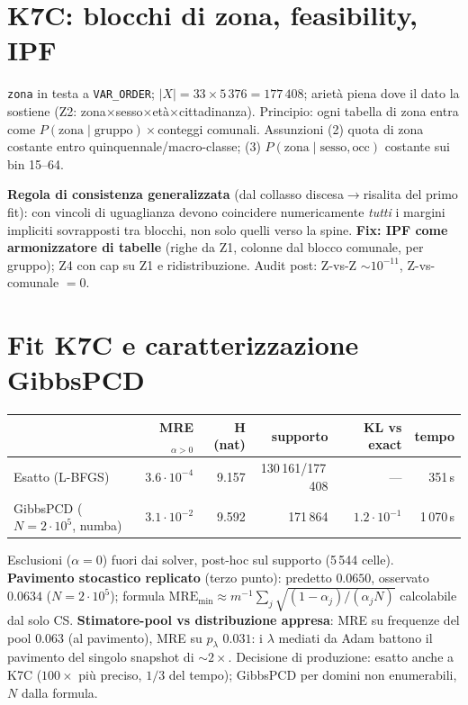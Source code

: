 \documentclass[11pt,a4paper]{article}
\newcommand{\code}[1]{\texttt{#1}}
\begin{document}
\section{K7C: blocchi di zona, feasibility, IPF}
\label{sec:k7c}
\code{zona} in testa a \code{VAR\_ORDER}; $|X| = 33\times5\,376 = 177\,408$;
ariet\`a piena dove il dato la sostiene (Z2:
zona$\times$sesso$\times$et\`a$\times$cittadinanza). Principio: ogni tabella
di zona entra come $P(\text{zona}\mid\text{gruppo})\times$conteggi comunali.
Assunzioni (2) quota di zona costante entro quinquennale/macro-classe;
(3) $P(\text{zona}\mid\text{sesso},\text{occ})$ costante sui bin 15--64.

\medskip\noindent\textbf{Regola di consistenza generalizzata} (dal collasso
discesa$\to$risalita del primo fit): con vincoli di uguaglianza devono
coincidere numericamente \emph{tutti} i margini impliciti sovrapposti tra
blocchi, non solo quelli verso la spine. \textbf{Fix: IPF come armonizzatore
di tabelle} (righe da Z1, colonne dal blocco comunale, per gruppo); Z4 con
cap su Z1 e ridistribuzione. Audit post: Z-vs-Z $\sim10^{-11}$,
Z-vs-comunale $=0$.

\section{Fit K7C e caratterizzazione GibbsPCD}
\begin{center}
\small
\begin{tabular}{@{}lrrrrr@{}}
\toprule
 & \textbf{MRE}$_{\alpha>0}$ & \textbf{H (nat)} & \textbf{supporto} & \textbf{KL vs exact} & \textbf{tempo}\\
\midrule
Esatto (L-BFGS) & $3.6\cdot10^{-4}$ & 9.157 & 130\,161/177\,408 & --- & 351\,s\\
GibbsPCD ($N{=}2\cdot10^5$, numba) & $3.1\cdot10^{-2}$ & 9.592 & 171\,864 & $1.2\cdot10^{-1}$ & 1\,070\,s\\
\bottomrule
\end{tabular}
\end{center}
Esclusioni ($\alpha=0$) fuori dai solver, post-hoc sul supporto (5\,544
celle). \textbf{Pavimento stocastico replicato} (terzo punto):
predetto $0.0650$, osservato $0.0634$ ($N=2\cdot10^5$); formula
$\text{MRE}_{\min}\approx m^{-1}\sum_j\sqrt{(1-\alpha_j)/(\alpha_j N)}$
calcolabile dal solo CS. \textbf{Stimatore-pool vs distribuzione appresa}:
MRE su frequenze del pool $0.063$ (al pavimento), MRE su $p_\lambda$
$0.031$: i $\lambda$ mediati da Adam battono il pavimento del singolo
snapshot di $\sim2\times$. Decisione di produzione: esatto anche a K7C
($100\times$ pi\`u preciso, $1/3$ del tempo); GibbsPCD per domini non
enumerabili, $N$ dalla formula.
\end{document}
